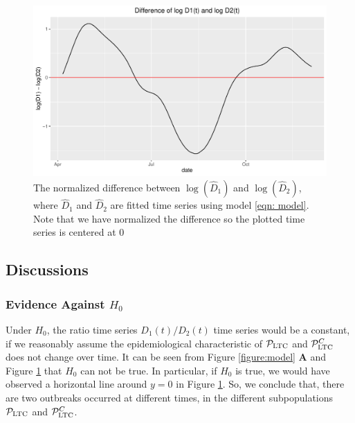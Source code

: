 \documentclass[12pt]{article}
\begin{document}
\begin{figure}
    \centering
    \includegraphics[scale = 0.7]{log_dif.pdf}
    \caption{The normalized difference between $\log(\widehat D_1)$ and $\log(\widehat D_2)$, where $\widehat D_1$ and $\widehat D_2$ are fitted time series using model \eqref{eqn: model}. Note that
    we have normalized the difference so the plotted time series is centered at $0$
     \label{fig: log diff}
    }
\end{figure}

\subsection{Discussions}


\subsubsection{Evidence Against $H_0$}
Under $H_0$, the ratio time series $D_1(t)/D_2(t)$ time series would be a constant, if we reasonably assume
the epidemiological characteristic of $\mathcal P_{\mathrm{LTC}}$ and $\mathcal P_{\mathrm{LTC}}^C$ does not change over time.
It can be seen from Figure \ref{figure:model} \textbf{A} and Figure \ref{fig: log diff} that $H_0$ can not be true. In particular, if $H_0$ is true, we would have observed a horizontal line around $y =0$ in Figure \ref{fig: log diff}.
So, we conclude that, there are two outbreaks occurred at different times, in the different subpopulations $\mathcal P_{\mathrm{LTC}}$ and $\mathcal P_{\mathrm{LTC}}^C$.
\end{document}
